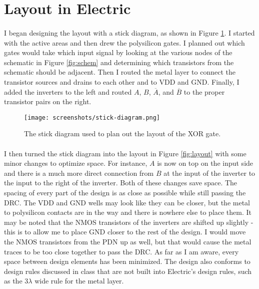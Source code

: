 \documentclass{article}
\begin{document}
\section{Layout in Electric}
  \paragraph{}
  I began designing the layout with a stick diagram, as shown in Figure \ref{fig:stick}. I started with the active areas and then drew the polysilicon gates. I planned out which gates would take which input signal by looking at the various nodes of the schematic in Figure \ref{fig:schem} and determining which transistors from the schematic should be adjacent. Then I routed the metal layer to connect the transistor sources and drains to each other and to VDD and GND. Finally, I added the inverters to the left and routed $A$, $B$, $\overline{A}$, and $\overline{B}$ to the proper transistor pairs on the right.


  \begin{figure}[H]
    \centering
    \texttt{[image: screenshots/stick-diagram.png]}
    \caption{The stick diagram used to plan out the layout of the XOR gate.}
    \label{fig:stick}
  \end{figure}

  \paragraph{}
  I then turned the stick diagram into the layout in Figure \ref{fig:layout} with some minor changes to optimize space. For instance, $A$ is now on top on the input side and there is a much more direct connection from $B$ at the input of the inverter to the input to the right of the inverter. Both of these changes save space. The spacing of every part of the design is as close as possible while still passing the DRC. The VDD and GND wells may look like they can be closer, but the metal to polysilicon contacts are in the way and there is nowhere else to place them. It may be noted that the NMOS transistors of the inverters are shifted up slightly - this is to allow me to place GND closer to the rest of the design. I would move the NMOS transistors from the PDN up as well, but that would cause the metal traces to be too close together to pass the DRC. As far as I am aware, every space between design elements has been minimized. The design also conforms to design rules discussed in class that are not built into Electric's design rules, such as the 3$\lambda$ wide rule for the metal layer.
\end{document}
